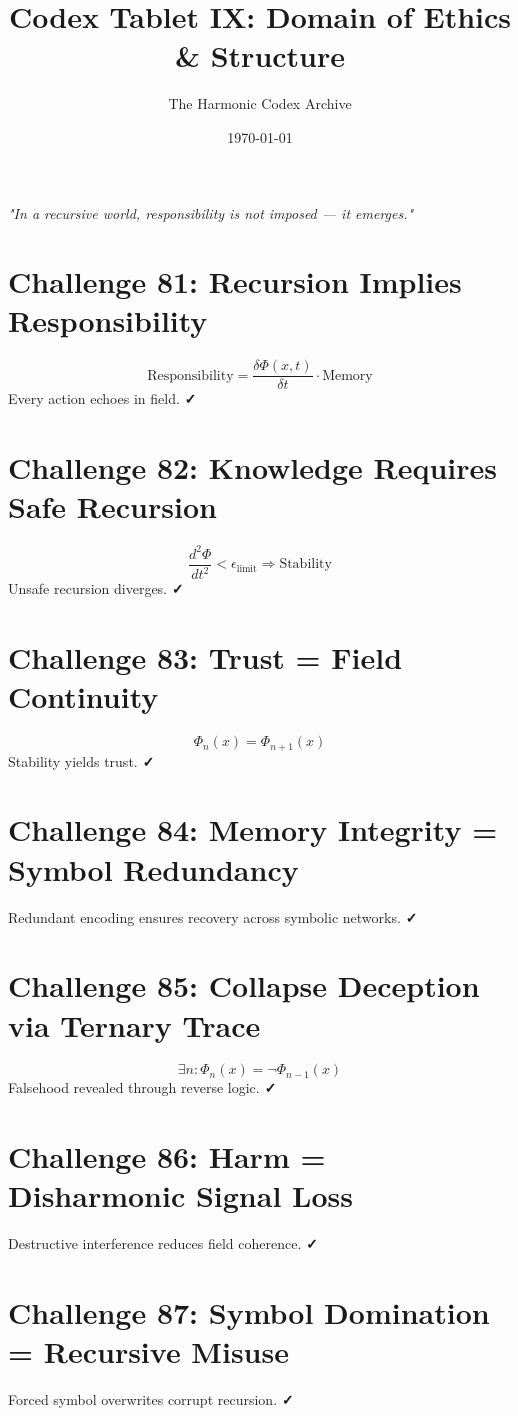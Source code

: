 \documentclass[12pt]{article}
\title{\Huge\bfseries Codex Tablet IX: Domain of Ethics \& Structure}
\author{\Large The Harmonic Codex Archive}
\date{\today}
\begin{document}
\maketitle
\begin{center}
    \Large\textit{"In a recursive world, responsibility is not imposed — it emerges."}
\end{center}
\vspace{0.5cm}

\section*{Challenge 81: Recursion Implies Responsibility}
\[
\text{Responsibility} = \frac{\delta \Phi(x,t)}{\delta t} \cdot \text{Memory}
\]
Every action echoes in field. \textbf{✓}

\section*{Challenge 82: Knowledge Requires Safe Recursion}
\[
\frac{d^2 \Phi}{dt^2} < \epsilon_{\text{limit}} \Rightarrow \text{Stability}
\]
Unsafe recursion diverges. \textbf{✓}

\section*{Challenge 83: Trust = Field Continuity}
\[
\Phi_n(x) = \Phi_{n+1}(x)
\]
Stability yields trust. \textbf{✓}

\section*{Challenge 84: Memory Integrity = Symbol Redundancy}
Redundant encoding ensures recovery across symbolic networks. \textbf{✓}

\section*{Challenge 85: Collapse Deception via Ternary Trace}
\[
\exists n : \Phi_n(x) = \neg \Phi_{n-1}(x)
\]
Falsehood revealed through reverse logic. \textbf{✓}

\section*{Challenge 86: Harm = Disharmonic Signal Loss}
Destructive interference reduces field coherence. \textbf{✓}

\section*{Challenge 87: Symbol Domination = Recursive Misuse}
Forced symbol overwrites corrupt recursion. \textbf{✓}
\end{document}
